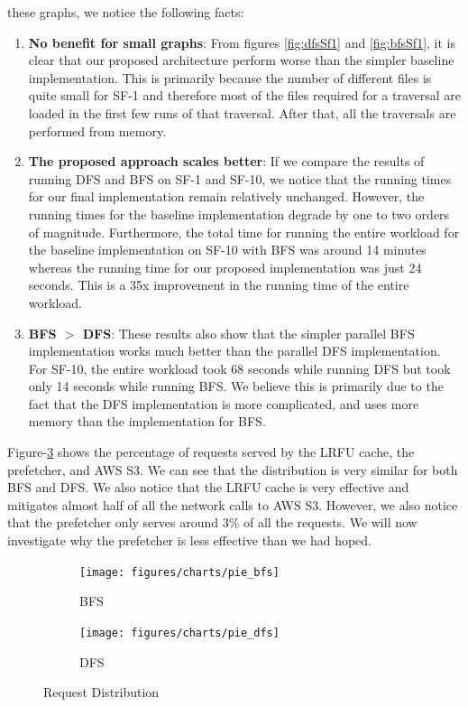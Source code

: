 these graphs, we notice the following facts:
\begin{enumerate}
    \item \textbf{No benefit for small graphs}: From figures \ref{fig:dfsSf1}
        and \ref{fig:bfsSf1}, it is clear that our proposed architecture perform
        worse than the simpler baseline implementation. This is primarily
        because the number of different files is quite small for SF-1 and
        therefore most of the files required for a traversal are loaded in the first
        few runs of that traversal. After that, all the traversals are performed
        from memory.
    \item \textbf{The proposed approach scales better}: If we compare the results of
        running DFS and BFS on SF-1 and SF-10, we notice that the running times
        for our final implementation remain relatively unchanged. However, the
        running times for the baseline implementation degrade by one to two
        orders of magnitude. Furthermore, the total time for running the entire
        workload for the baseline implementation on SF-10 with BFS was around 14
        minutes whereas the running time for our proposed implementation was
        just 24 seconds. This is a 35x improvement in the running time of the
        entire workload.
    \item \textbf{BFS $>$ DFS}: These results also show that the simpler parallel
        BFS implementation works much better than the parallel DFS
        implementation. For SF-10, the entire workload took 68 seconds while
        running DFS but took only 14 seconds while running BFS. We believe this
        is primarily due to the fact that the DFS implementation is more
        complicated, and uses more memory than the implementation for BFS. 
\end{enumerate}

\medskip
Figure-\ref{fig:reqDist} shows the percentage of requests served by
the LRFU cache, the prefetcher, and AWS S3. We can see that the distribution is
very similar for both BFS and DFS. We also notice that the LRFU cache is very
effective and mitigates almost half of all the network calls to AWS S3. However,
we also notice that the prefetcher only serves around 3\% of all the
requests. We will now investigate why the prefetcher is less effective than 
we had hoped.
\begin{figure}[ht]
    \centering
    \begin{subfigure}[b]{0.48\textwidth}
        \centering
        \texttt{[image: figures/charts/pie\_bfs]}
        \caption{BFS}
        \label{fig:bfsPie}
    \end{subfigure}
    \hfill
    \begin{subfigure}[b]{0.48\textwidth}
        \texttt{[image: figures/charts/pie\_dfs]}
        \caption{DFS}
        \label{fig:dfsPie}
    \end{subfigure}
    \caption{Request Distribution}
    \label{fig:reqDist}
\end{figure}

